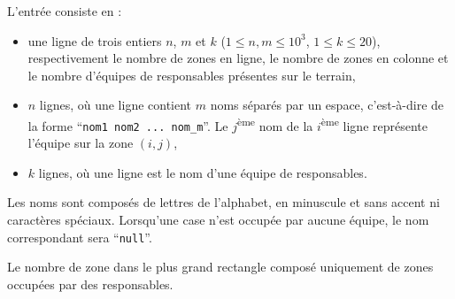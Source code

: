 \begin{Input}
	L'entrée consiste en :
	\begin{itemize}
		\item une ligne de trois entiers $n$, $m$ et $k$ ($1 \le n,m \le 10^3$, $1 \le k \le 20$),
respectivement le nombre de zones en ligne, le nombre de zones en colonne et le nombre d'équipes de responsables présentes sur le terrain,
		\item $n$ lignes, où une ligne contient $m$ noms séparés par un espace, c'est-à-dire de la forme ``\verb|nom1 nom2 ... nom_m|''. Le $j$\textsuperscript{ème} nom de la $i$\textsuperscript{ème} ligne représente l'équipe sur la zone $(i,j)$,
		\item $k$ lignes, où une ligne est le nom d'une équipe de responsables.
	\end{itemize}
	Les noms sont composés de lettres de l'alphabet, en minuscule et sans accent ni caractères spéciaux. Lorsqu'une case n'est occupée par aucune équipe, le nom correspondant sera ``\verb|null|''.
\end{Input}

\begin{Output}
    Le nombre de zone dans le plus grand rectangle composé uniquement de zones occupées par des responsables.
\end{Output}
